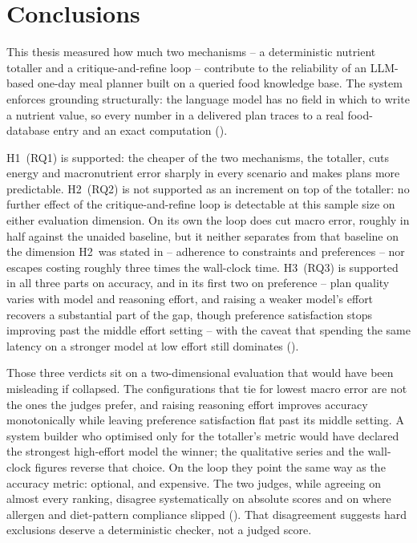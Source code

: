 \chapter{Conclusions}
\label{cha:conclusions}

This thesis measured how much two mechanisms -- a deterministic nutrient totaller and a critique-and-refine loop -- contribute to the reliability of an LLM-based one-day meal planner built on a queried food knowledge base. The system enforces grounding structurally: the language model has no field in which to write a nutrient value, so every number in a delivered plan traces to a real food-database entry and an exact computation ().

H1~(RQ1) is supported: the cheaper of the two mechanisms, the totaller, cuts energy and macronutrient error sharply in every scenario and makes plans more predictable. H2~(RQ2) is not supported as an increment on top of the totaller: no further effect of the critique-and-refine loop is detectable at this sample size on either evaluation dimension. On its own the loop does cut macro error, roughly in half against the unaided baseline, but it neither separates from that baseline on the dimension H2~was stated in -- adherence to constraints and preferences -- nor escapes costing roughly three times the wall-clock time. H3~(RQ3) is supported in all three parts on accuracy, and in its first two on preference -- plan quality varies with model and reasoning effort, and raising a weaker model's effort recovers a substantial part of the gap, though preference satisfaction stops improving past the middle effort setting -- with the caveat that spending the same latency on a stronger model at low effort still dominates ().

Those three verdicts sit on a two-dimensional evaluation that would have been misleading if collapsed. The configurations that tie for lowest macro error are not the ones the judges prefer, and raising reasoning effort improves accuracy monotonically while leaving preference satisfaction flat past its middle setting. A system builder who optimised only for the totaller's metric would have declared the strongest high-effort model the winner; the qualitative series and the wall-clock figures reverse that choice. On the loop they point the same way as the accuracy metric: optional, and expensive. The two judges, while agreeing on almost every ranking, disagree systematically on absolute scores and on where allergen and diet-pattern compliance slipped (). That disagreement suggests hard exclusions deserve a deterministic checker, not a judged score.

